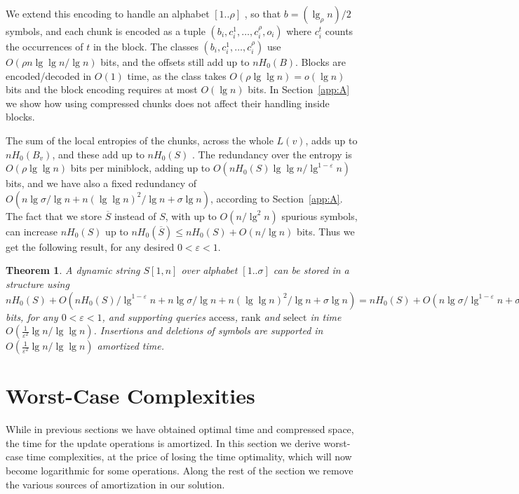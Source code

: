 \documentclass[11pt]{article}
\def\idrm#1{\ensuremath{\mathrm{#1}}}
\newtheorem{theorem}{Theorem}
\newcommand{\oS}{\overline{S}}
\newcommand{\ra}{\idrm{rank}}
\newcommand{\sel}{\idrm{select}}
\newcommand{\acc}{\idrm{access}}
\newcommand{\eps}{\varepsilon}
\begin{document}
We extend this encoding to handle an alphabet $[1..\rho]$ 
\cite{FMMN07}, so that $b = (\lg_\rho n)/2$ symbols, and each chunk is
encoded as a tuple $(b_i,c_i^1,\ldots,c_i^\rho,o_i)$ where $c_i^t$ counts
the occurrences of $t$ in the block. The classes
$(b_i,c_i^1,\ldots,c_i^\rho)$ use $O(\rho n \lg\lg n / \lg n)$ bits, and
the offsets still add up to $nH_0(B)$. Blocks are encoded/decoded in
$O(1)$ time, as the class takes $O(\rho \lg\lg n) = o(\lg n)$ bits and
the block encoding requires at most $O(\lg n)$ bits.
In Section~\ref{app:A} we show how using compressed chunks does not affect
their handling inside blocks.

The sum of the local entropies of the chunks, across the whole 
$L(v)$, adds up to $nH_0(B_v)$, and these add up to $nH_0(S)$ \cite{GGV03}.
The redundancy over the entropy is $O(\rho \lg\lg n)$ bits per
miniblock, adding up to $O(n H_0(S) \lg\lg n / \lg^{1-\eps} n)$ bits, and
we have also a fixed redundancy of $O(n\lg\sigma/\lg n + n(\lg\lg n)^2/\lg n+
\sigma\lg n)$, according to
Section~\ref{app:A}.
The fact that we store $\oS$ instead of $S$, with up to $O(n/\lg^2 n)$ spurious
symbols, can increase $nH_0(S)$ up to $nH_0(\oS) \le nH_0(S)+O(n/\lg n)$ bits.
Thus we get the following result, for any desired $0<\eps<1$.

\begin{theorem}
\label{thm:compr}
A dynamic string $S[1,n]$ over alphabet $[1..\sigma]$ 
can be stored in a structure using 
$nH_0(S) + O(nH_0(S)/\lg^{1-\eps}n+n\lg\sigma/\lg n + n(\lg\lg n)^2/\lg n + \sigma\lg n) = nH_0(S) + O(n\lg\sigma/\lg^{1-\eps} n + \sigma\lg n)$ bits,
for any $0<\eps<1$,
and supporting queries
$\acc$, $\ra$ and $\sel$ in time $O(\frac{1}{\eps^2}\lg n/\lg \lg n)$.
Insertions and deletions of symbols 
are supported in $O(\frac{1}{\eps^2}\lg n/\lg \lg n)$ amortized time. 
\end{theorem}

\section{Worst-Case Complexities} \label{sec:worst}

While in previous sections we have obtained optimal time and compressed space,
the time for the update operations is amortized. In this section we derive
worst-case time complexities, at the price of losing the time optimality,
which will now become logarithmic for some operations. 
Along the rest of the section we remove the various sources of amortization 
in our solution.
\end{document}
